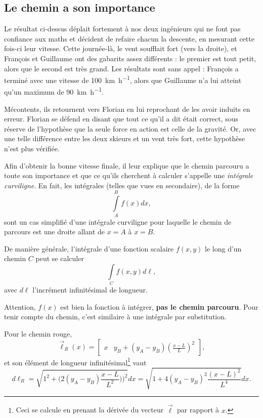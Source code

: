 \documentclass{cup-pan}
\begin{document}



\subsection{Le chemin a son importance}

Le résultat ci-dessus déplait fortement à nos deux ingénieurs qui ne font pas confiance aux maths et décident de refaire chacun la descente, en mesurant cette fois-ci leur vitesse. Cette journée-là, le vent soufflait fort (vers la droite), et François et Guillaume ont des gabarits assez différents : le premier est tout petit, alors que le second est très grand. Les résultats sont sans appel : François a terminé avec une vitesse de \SI{100}{\kilo\meter\per\hour}, alors que Guillaume n'a lui atteint qu'un maximum de \SI{90}{\kilo\meter\per\hour}.

Mécontents, ils retournent vers Florian en lui reprochant de les avoir induits en erreur. Florian se défend en disant que tout ce qu'il a dit était correct, sous réserve de l'hypothèse que la seule force en action est celle de la gravité. Or, avec une telle différence entre les deux skieurs et un vent très fort, cette hypothèse n'est plus vérifiée.

Afin d'obtenir la bonne vitesse finale, il leur explique que le chemin parcouru a toute son importance et que ce qu'ils cherchent à calculer s'appelle une \emph{intégrale curviligne}. En fait, les intégrales (telles que vues en secondaire), de la forme
\begin{equation}
    \int\limits_A^B f(x) dx,
\end{equation}
sont un cas simplifié d'une intégrale curviligne pour laquelle le chemin de parcours est une droite allant de $x=A$ à $x=B$.

De manière générale, l'intégrale d'une fonction scalaire $f(x,y)$ le long d'un chemin $C$ peut se calculer
\begin{equation}\label{eq:int_scal}
    \int\limits_C f(x,y) d\ell,
\end{equation}
avec $d\ell$ l'incrément infinitésimal de longueur. 

Attention, $f(x)$ est bien la fonction à intégrer, \textbf{pas le chemin parcouru}. Pour tenir compte du chemin, c'est similaire à une intégrale par substitution.

Pour le chemin rouge, 
\begin{equation}
    \vec{\ell}_R(x) = \begin{bmatrix}x & y_B + (y_A - y_B)\left(\frac{x-L}{L}\right)^2\end{bmatrix},
\end{equation}
et son élément de longueur infinitésimal\footnote{Ceci se calcule en prenant la dérivée du vecteur $\vec{\ell}$ par rapport à $x$.} vaut
\begin{equation}
    d\ell_R = \sqrt{1^2 + \Big(2(y_A - y_B)\frac{x-L}{L^2})\Big)^2} dx = \sqrt{1  + 4(y_A-y_B)^2 \frac{(x-L)^2}{L^4}} dx.
\end{equation}
\end{document}
